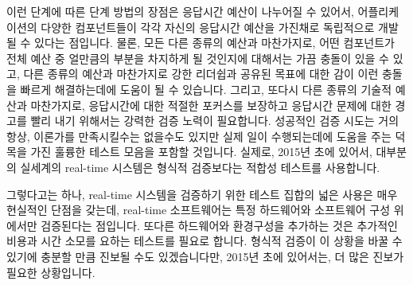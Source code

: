 이런 단계에 따른 단계 방법의 장점은 응답시간 예산이 나누어질 수 있어서,
어플리케이션의 다양한 컴포넌트들이 각각 자신의 응답시간 예산을 가진채로
독립적으로 개발될 수 있다는 점입니다.
물론, 모든 다른 종류의 예산과 마찬가지로, 어떤 컴포넌트가 전체 예산 중 얼만큼의
부분을 차지하게 될 것인지에 대해서는 가끔 충돌이 있을 수 있고, 다른 종류의
예산과 마찬가지로 강한 리더쉽과 공유된 목표에 대한 감이 이런 충돌을 빠르게
해결하는데에 도움이 될 수 있습니다.
그리고, 또다시 다른 종류의 기술적 예산과 마찬가지로, 응답시간에 대한 적절한
포커스를 보장하고 응답시간 문제에 대한 경고를 빨리 내기 위해서는 강력한 검증
노력이 필요합니다.
성공적인 검증 시도는 거의 항상, 이론가를 만족시킬수는 없을수도 있지만 실제 일이
수행되는데에 도움을 주는 덕목을 가진 훌륭한 테스트 모음을 포함할 것입니다.
실제로, 2015년 초에 있어서, 대부분의 실세계의 real-time 시스템은 형식적
검증보다는 적합성 테스트를 사용합니다.

그렇다고는 하나, real-time 시스템을 검증하기 위한 테스트 집합의 넓은 사용은
매우 현실적인 단점을 갖는데, real-time 소프트웨어는 특정 하드웨어와 소프트웨어
구성 위에서만 검증된다는 점입니다.
또다른 하드웨어와 환경구성을 추가하는 것은 추가적인 비용과 시간 소모를 요하는
테스트를 필요로 합니다.
형식적 검증이 이 상황을 바꿀 수 있기에 충분할 만큼 진보될 수도 있겠습니다만,
2015년 초에 있어서는, 더 많은 진보가 필요한 상황입니다.

